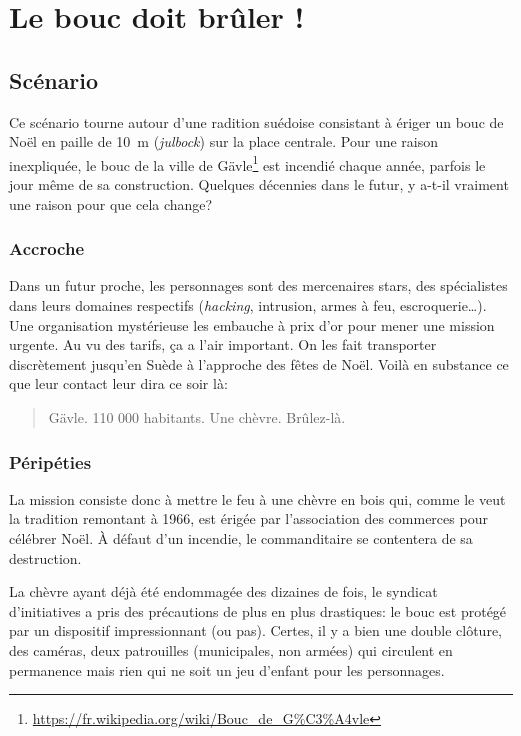 \chapter{Le bouc doit brûler !}

\section{Scénario}

Ce scénario tourne autour d'une radition suédoise consistant à ériger un bouc de Noël en paille de \SI{10}{\meter} (\emph{julbock}) sur la place centrale.
Pour une raison inexpliquée, le bouc de la ville de Gävle\footnote{\url{https://fr.wikipedia.org/wiki/Bouc_de_G\%C3\%A4vle}} est incendié chaque année, parfois le jour même de sa construction.
Quelques décennies dans le futur, y a-t-il vraiment une raison pour que cela change?

\subsection{Accroche}

Dans un futur proche, les personnages sont des mercenaires stars, des spécialistes dans leurs domaines respectifs (\emph{hacking}, intrusion, armes à feu, escroquerie\dots).
Une organisation mystérieuse les embauche à prix d'or pour mener une mission urgente. Au vu des tarifs, ça a l'air important.
On les fait transporter discrètement jusqu'en Suède à l'approche des fêtes de Noël.
Voilà en substance ce que leur contact leur dira ce soir là:

\blockquote{Gävle. 110 000 habitants. Une chèvre. Brûlez-là.}

\subsection{Péripéties}

La mission consiste donc à mettre le feu à une chèvre en bois qui, comme le veut la tradition remontant à 1966, est érigée par l'association des commerces pour célébrer Noël.
À défaut d'un incendie, le commanditaire se contentera de sa destruction.

La chèvre ayant déjà été endommagée des dizaines de fois, le syndicat d'initiatives a pris des précautions de plus en plus drastiques: le bouc est protégé par un dispositif impressionnant (ou pas).
Certes, il y a bien une double clôture, des caméras, deux patrouilles (municipales, non armées) qui circulent en permanence mais rien qui ne soit un jeu d'enfant pour les personnages.

